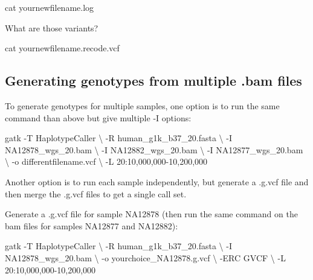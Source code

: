 \documentclass[]{book}
\newenvironment{Shaded}{\begin{snugshade}}{\end{snugshade}}
\newcommand{\FunctionTok}[1]{\textcolor[rgb]{0.00,0.00,0.00}{#1}}
\newcommand{\ExtensionTok}[1]{#1}
\newcommand{\NormalTok}[1]{#1}
\begin{document}
\begin{Shaded}
\begin{Highlighting}[]
\FunctionTok{cat}\NormalTok{ yournewfilename.log}
\end{Highlighting}
\end{Shaded}

What are those variants?

\begin{Shaded}
\begin{Highlighting}[]
\FunctionTok{cat}\NormalTok{ yournewfilename.recode.vcf}
\end{Highlighting}
\end{Shaded}

\subsection{Generating genotypes from multiple .bam
files}\label{generating-genotypes-from-multiple-.bam-files}

To generate genotypes for multiple samples, one option is to run the
same command than above but give multiple -I options:

\begin{Shaded}
\begin{Highlighting}[]
\ExtensionTok{gatk}\NormalTok{ -T HaplotypeCaller \textbackslash{}}
\NormalTok{-R human_g1k_b37_20.fasta \textbackslash{}}
\NormalTok{-I NA12878_wgs_20.bam \textbackslash{}}
\NormalTok{-I NA12882_wgs_20.bam \textbackslash{}}
\NormalTok{-I NA12877_wgs_20.bam \textbackslash{}}
\NormalTok{-o differentfilename.vcf \textbackslash{}}
\NormalTok{-L 20:10,000,000-10,200,000}
\end{Highlighting}
\end{Shaded}

Another option is to run each sample independently, but generate a
.g.vcf file and then merge the .g.vcf files to get a single call set.

Generate a .g.vcf file for sample NA12878 (then run the same command on
the bam files for samples NA12877 and NA12882):

\begin{Shaded}
\begin{Highlighting}[]
\ExtensionTok{gatk}\NormalTok{ -T HaplotypeCaller \textbackslash{}}
\NormalTok{-R human_g1k_b37_20.fasta \textbackslash{}}
\NormalTok{-I NA12878_wgs_20.bam \textbackslash{}}
\NormalTok{-o yourchoice_NA12878.g.vcf \textbackslash{}}
\NormalTok{-ERC GVCF \textbackslash{}}
\NormalTok{-L 20:10,000,000-10,200,000}
\end{Highlighting}
\end{Shaded}
\end{document}
